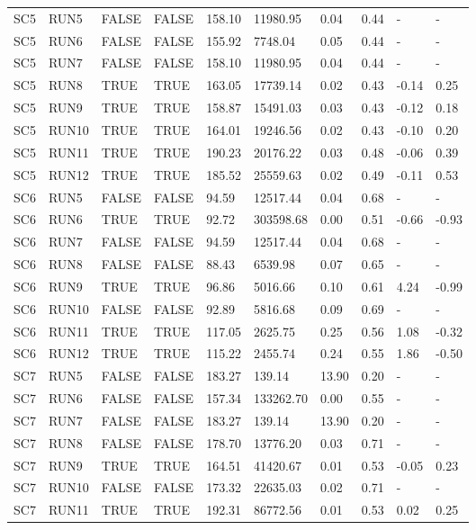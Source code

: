 \documentclass[
  12pt,
]{article}
\begin{document}
\begin{landscape}
\begin{longtable}[t]{llllllllll}
\endfoot
\bottomrule
\endlastfoot
SC5 & RUN5 & FALSE & FALSE & 158.10 & 11980.95 & 0.04 & 0.44 & - & -\\
SC5 & RUN6 & FALSE & FALSE & 155.92 & 7748.04 & 0.05 & 0.44 & - & -\\
SC5 & RUN7 & FALSE & FALSE & 158.10 & 11980.95 & 0.04 & 0.44 & - & -\\
SC5 & RUN8 & TRUE & TRUE & 163.05 & 17739.14 & 0.02 & 0.43 & -0.14 & 0.25\\
SC5 & RUN9 & TRUE & TRUE & 158.87 & 15491.03 & 0.03 & 0.43 & -0.12 & 0.18\\
\addlinespace
SC5 & RUN10 & TRUE & TRUE & 164.01 & 19246.56 & 0.02 & 0.43 & -0.10 & 0.20\\
SC5 & RUN11 & TRUE & TRUE & 190.23 & 20176.22 & 0.03 & 0.48 & -0.06 & 0.39\\
SC5 & RUN12 & TRUE & TRUE & 185.52 & 25559.63 & 0.02 & 0.49 & -0.11 & 0.53\\
SC6 & RUN5 & FALSE & FALSE & 94.59 & 12517.44 & 0.04 & 0.68 & - & -\\
SC6 & RUN6 & TRUE & TRUE & 92.72 & 303598.68 & 0.00 & 0.51 & -0.66 & -0.93\\
\addlinespace
SC6 & RUN7 & FALSE & FALSE & 94.59 & 12517.44 & 0.04 & 0.68 & - & -\\
SC6 & RUN8 & FALSE & FALSE & 88.43 & 6539.98 & 0.07 & 0.65 & - & -\\
SC6 & RUN9 & TRUE & TRUE & 96.86 & 5016.66 & 0.10 & 0.61 & 4.24 & -0.99\\
SC6 & RUN10 & FALSE & FALSE & 92.89 & 5816.68 & 0.09 & 0.69 & - & -\\
SC6 & RUN11 & TRUE & TRUE & 117.05 & 2625.75 & 0.25 & 0.56 & 1.08 & -0.32\\
\addlinespace
SC6 & RUN12 & TRUE & TRUE & 115.22 & 2455.74 & 0.24 & 0.55 & 1.86 & -0.50\\
SC7 & RUN5 & FALSE & FALSE & 183.27 & 139.14 & 13.90 & 0.20 & - & -\\
SC7 & RUN6 & FALSE & FALSE & 157.34 & 133262.70 & 0.00 & 0.55 & - & -\\
SC7 & RUN7 & FALSE & FALSE & 183.27 & 139.14 & 13.90 & 0.20 & - & -\\
SC7 & RUN8 & FALSE & FALSE & 178.70 & 13776.20 & 0.03 & 0.71 & - & -\\
\addlinespace
SC7 & RUN9 & TRUE & TRUE & 164.51 & 41420.67 & 0.01 & 0.53 & -0.05 & 0.23\\
SC7 & RUN10 & FALSE & FALSE & 173.32 & 22635.03 & 0.02 & 0.71 & - & -\\
SC7 & RUN11 & TRUE & TRUE & 192.31 & 86772.56 & 0.01 & 0.53 & 0.02 & 0.25\\

\end{longtable}
\end{landscape}
\end{document}
